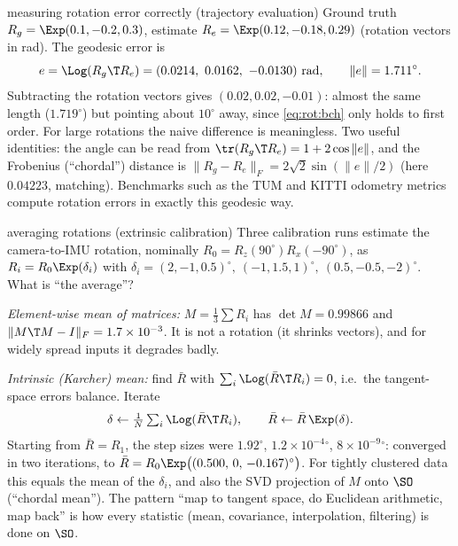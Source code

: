 \begin{example}{measuring rotation error correctly (trajectory evaluation)}
Ground truth $R_g=\Exp(0.1,-0.2,0.3)$, estimate $R_e=\Exp(0.12,-0.18,0.29)$ (rotation vectors in rad). The geodesic error is
\[
e=\Log(R_g\T R_e)=(0.0214,\ 0.0162,\ -0.0130)\ \text{rad},\qquad \|e\|=1.711^\circ .
\]
Subtracting the rotation vectors gives $(0.02,0.02,-0.01)$: almost the same length ($1.719^\circ$) but pointing about $10^\circ$ away, since \eqref{eq:rot:bch} only holds to first order. For large rotations the naive difference is meaningless. Two useful identities: the angle can be read from $\tr(R_g\T R_e)=1+2\cos\|e\|$, and the Frobenius (``chordal'') distance is $\|R_g-R_e\|_F=2\sqrt2\sin(\|e\|/2)$ (here $0.04223$, matching). Benchmarks such as the TUM and KITTI odometry metrics compute rotation errors in exactly this geodesic way.
\end{example}

\begin{example}{averaging rotations (extrinsic calibration)}
Three calibration runs estimate the camera-to-IMU rotation, nominally $R_0=R_z(90^\circ)R_x(-90^\circ)$, as $R_i=R_0\Exp(\delta_i)$ with $\delta_i=(2,-1,0.5)^\circ,\ (-1,1.5,1)^\circ,\ (0.5,-0.5,-2)^\circ$. What is ``the average''?

\emph{Element-wise mean of matrices:} $M=\frac13\sum R_i$ has $\det M=0.99866$ and $\|M\T M-I\|_F=1.7\times10^{-3}$. It is not a rotation (it shrinks vectors), and for widely spread inputs it degrades badly.

\emph{Intrinsic (Karcher) mean:} find $\bar R$ with $\sum_i\Log(\bar R\T R_i)=0$, i.e.\ the tangent-space errors balance. Iterate
\[
\delta\leftarrow\tfrac1N\textstyle\sum_i\Log(\bar R\T R_i),\qquad \bar R\leftarrow\bar R\,\Exp(\delta).
\]
Starting from $\bar R=R_1$, the step sizes were $1.92^\circ$, $1.2\times10^{-4}{}^\circ$, $8\times10^{-9}{}^\circ$: converged in two iterations, to $\bar R=R_0\Exp\big((0.500,\,0,\,-0.167)^\circ\big)$. For tightly clustered data this equals the mean of the $\delta_i$, and also the SVD projection of $M$ onto $\SO$ (``chordal mean''). The pattern ``map to tangent space, do Euclidean arithmetic, map back'' is how every statistic (mean, covariance, interpolation, filtering) is done on $\SO$.
\end{example}
